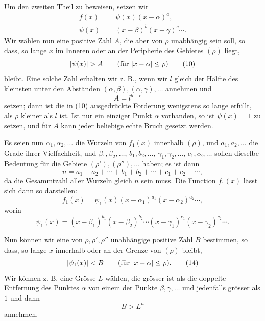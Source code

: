 \documentclass[11pt]{article}
\begin{document}
Um den zweiten Theil zu beweisen, setzen wir
\begin{align}
 f(x)&=\psi(x)(x-\alpha)^a,
\tag{8}\\
 \psi(x)&=(x-\beta)^b(x-\gamma)^c\cdots .
\tag{9}
\end{align}
Wir wählen nun eine positive Zahl $A$, die aber von $\rho$ unabhängig sein soll, so dass, so lange $x$ im Inneren oder an der Peripherie des Gebietes $(\rho)$ liegt,
\begin{equation}
 |\psi(x)|>A \qquad (\hbox{für } |x-\alpha|\le \rho)
\tag{10}
\end{equation}
bleibt. Eine solche Zahl erhalten wir z. B., wenn wir $l$ gleich der Hälfte des kleinsten unter den Abständen $(\alpha,\beta),(\alpha,\gamma),\ldots$ annehmen und
\[
 A=l^{b+c+\cdots}
\]
setzen; dann ist die in (10) ausgedrückte Forderung wenigstens so lange erfüllt, als $\rho$ kleiner als $l$ ist. Ist nur ein einziger Punkt $\alpha$ vorhanden, so ist $\psi(x)=1$ zu setzen, und für $A$ kann jeder beliebige echte Bruch gesetzt werden.

Es seien nun $\alpha_1,\alpha_2,
\ldots$ die Wurzeln von $f_1(x)$ innerhalb $(\rho)$, und $a_1,a_2,
\ldots$ die Grade ihrer Vielfachheit, und $\beta_1,\beta_2,
\ldots$, $b_1,b_2,
\ldots$, $\gamma_1,\gamma_2,
\ldots$, $c_1,c_2,
\ldots$ sollen dieselbe Bedeutung für die Gebiete $(\rho'),(\rho''),\ldots$ haben; es ist dann
\begin{equation}
 n=a_1+a_2+
\cdots+b_1+b_2+\cdots+c_1+c_2+\cdots,
\tag{11}
\end{equation}
da die Gesammtzahl aller Wurzeln gleich $n$ sein muss. Die Function $f_1(x)$ lässt sich dann so darstellen:
\begin{equation}
 f_1(x)=\psi_1(x)(x-\alpha_1)^{a_1}(x-\alpha_2)^{a_2}\cdots,
\tag{12}
\end{equation}
worin
\begin{equation}
 \psi_1(x)=(x-\beta_1)^{b_1}(x-\beta_2)^{b_2}\cdots
          (x-\gamma_1)^{c_1}(x-\gamma_2)^{c_2}\cdots .
\tag{13}
\end{equation}

Nun können wir eine von $\rho,\rho',\rho''$ unabhängige positive Zahl $B$ bestimmen, so dass, so lange $x$ innerhalb oder an der Grenze von $(\rho)$ bleibt,
\begin{equation}
 |\psi_1(x)|<B \qquad (\hbox{für } |x-\alpha|\le \rho).
\tag{14}
\end{equation}
Wir können z. B. eine Grösse $L$ wählen, die grösser ist als die doppelte Entfernung des Punktes $\alpha$ von einem der Punkte $\beta,\gamma,
\ldots$ und jedenfalls grösser als $1$ und dann
\[
 B>L^n
\]
annehmen.
\end{document}
